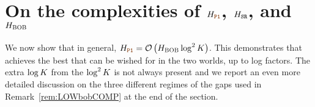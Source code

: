 \section{On the complexities of $\complexityProOne$, $H_{{\normalfont \texttt{SR}}}$, and 
	$H_{{\normalfont \textsc{{BOB}}}}$}  %
\label{s:moreOnRem}
%
%
 We now show that in general, 
	$\complexityProOne = \cO\left(\complexityBoth\log^2\nArms\right)$. 
	This demonstrates that \Pone{} achieves the best 
	that can be wished for in the two worlds, up to log
	 factors.
	The extra $\log K$ from the $\log^2K$ is not always
	present  and we report an 
	even more detailed discussion on the three different regimes of the
	gaps used in 
	Remark~\ref{rem:LOWbobCOMP}  at the end of the section.
	\setcounter{scratchcounter}{\value{theorem}}
	\cocores*
	\setcounter{theorem}{\the\numexpr\value{scratchcounter}}
